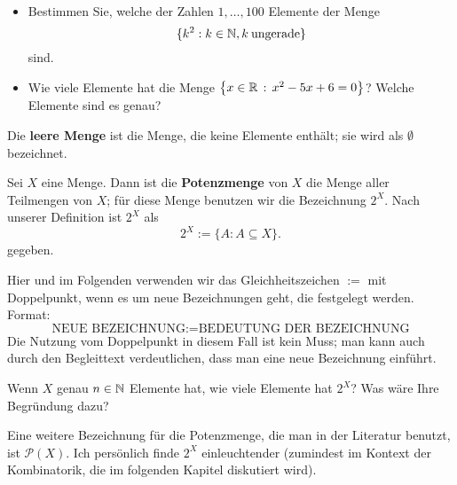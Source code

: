 \begin{aufg}\ 
\begin{itemize}
\item Bestimmen Sie, welche der Zahlen $1,\ldots, 100$ Elemente der Menge 
\[
	 \{ k^2 : k \in \mathbb{N}, k \: \text{ungerade} \} 
\]
sind. 
\item Wie viele Elemente hat die Menge $\left\{ x \in \mathbb{R} \,:\, x^2- 5 x + 6 = 0 \right\} $? Welche Elemente sind es genau? 
\end{itemize}
\end{aufg}

\begin{defn}
Die \textbf{leere Menge} ist die Menge, die keine Elemente enthält; sie wird als $ \emptyset $ bezeichnet. 
\end{defn} 

\begin{defn}[Potenzmenge]
Sei $ X $ eine Menge. Dann ist die \textbf{Potenzmenge} von $ X $ die Menge aller Teilmengen von $ X $; für diese Menge benutzen wir die Bezeichnung $ 2^X $. Nach unserer Definition ist $2^X$ als  
\[
	 2^X := \{ A : A \subseteq X \} .
\]
gegeben. 
\end{defn} 

\begin{bem} Hier und im Folgenden verwenden wir das Gleichheitszeichen $:=$ mit Doppelpunkt, wenn es um neue Bezeichnungen geht, die festgelegt werden. Format: 
	\[
		\text{NEUE BEZEICHNUNG} := \text{BEDEUTUNG DER BEZEICHNUNG}
	\]
	Die Nutzung vom Doppelpunkt in diesem Fall ist kein Muss; man kann auch durch den Begleittext verdeutlichen, dass man eine neue Bezeichnung einführt. 
\end{bem} 

\begin{aufg}
	Wenn $X$ genau $n \in \mathbb{N}$ Elemente hat, wie viele Elemente hat $2^X$? Was wäre Ihre Begründung dazu? 
\end{aufg} 

\begin{bem}
	Eine weitere Bezeichnung für die Potenzmenge, die man in der Literatur benutzt, ist $\mathcal{P}(X)$. Ich persönlich finde $2^X$ einleuchtender (zumindest im Kontext der Kombinatorik, die im folgenden Kapitel diskutiert wird). 
\end{bem} 


